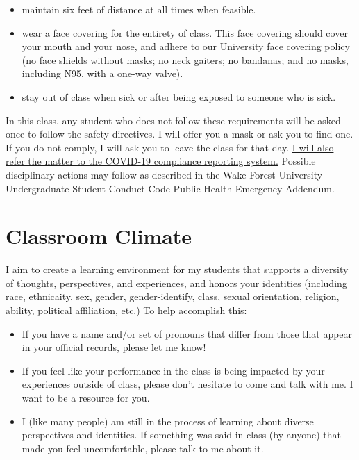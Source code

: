 \documentclass[11pt,]{article}
\providecommand{\tightlist}{%
  \setlength{\itemsep}{0pt}\setlength{\parskip}{0pt}}
\begin{document}
\begin{itemize}
\tightlist
\item
  maintain six feet of distance at all times when feasible.
\item
  wear a face covering for the entirety of class. This face covering
  should cover your mouth and your nose, and adhere to
  \href{https://drive.google.com/file/d/1Hc_yL-Pzec2TdfPTgrC18Cb96vympsbI/view}{our
  University face covering policy} (no face shields without masks; no
  neck gaiters; no bandanas; and no masks, including N95, with a one-way
  valve).
\item
  stay out of class when sick or after being exposed to someone who is
  sick.
\end{itemize}

In this class, any student who does not follow these requirements will
be asked once to follow the safety directives. I will offer you a mask
or ask you to find one. If you do not comply, I will ask you to leave
the class for that day.
\href{https://cm.maxient.com/reportingform.php?WakeForestUniv\&layout_id=40}{I
will also refer the matter to the COVID-19 compliance reporting system.}
Possible disciplinary actions may follow as described in the Wake Forest
University Undergraduate Student Conduct Code Public Health Emergency
Addendum.

\hypertarget{classroom-climate}{%
\section{Classroom Climate}\label{classroom-climate}}

I aim to create a learning environment for my students that supports a
diversity of thoughts, perspectives, and experiences, and honors your
identities (including race, ethnicaity, sex, gender, gender-identify,
class, sexual orientation, religion, ability, political affiliation,
etc.) To help accomplish this:

\begin{itemize}
\item
  If you have a name and/or set of pronouns that differ from those that
  appear in your official records, please let me know!
\item
  If you feel like your performance in the class is being impacted by
  your experiences outside of class, please don't hesitate to come and
  talk with me. I want to be a resource for you.
\item
  I (like many people) am still in the process of learning about diverse
  perspectives and identities. If something was said in class (by
  anyone) that made you feel uncomfortable, please talk to me about it.
\end{itemize}
\end{document}
